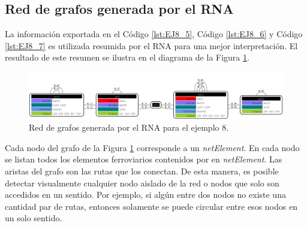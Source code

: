 \subsection{Red de grafos generada por el RNA}

 La información exportada en el Código \ref{lst:EJ8_5}, Código \ref{lst:EJ8_6} y Código \ref{lst:EJ8_7} es utilizada resumida por el RNA para una mejor interpretación. El resultado de este resumen se ilustra en el diagrama de la Figura \ref{fig:EJ8_8}.

	\begin{figure}[H]
		\centering
		\includegraphics[width=1\textwidth]{Figuras/Graph_8}
		\centering\caption{Red de grafos generada por el RNA para el ejemplo 8.}
		\label{fig:EJ8_8}
	\end{figure}
	
	Cada nodo del grafo de la Figura \ref{fig:EJ8_8} corresponde a un \textit{netElement}. En cada nodo se listan todos los elementos ferroviarios contenidos por en \textit{netElement}. Las aristas del grafo son las rutas que los conectan. De esta manera, es posible detectar visualmente cualquier nodo aislado de la red o nodos que solo son accedidos en un sentido. Por ejemplo, si algún entre dos nodos no existe una cantidad par de rutas, entonces solamente se puede circular entre esos nodos en un solo sentido.